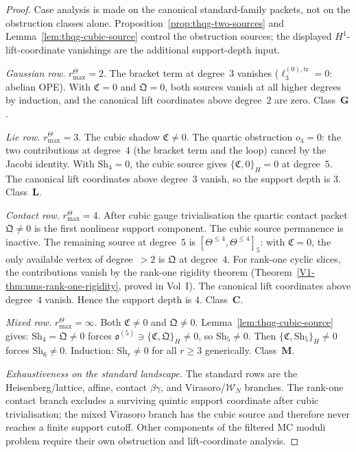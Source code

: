 \begin{proof}
Case analysis is made on the canonical standard-family packets,
not on the obstruction classes alone. Proposition~\ref{prop:thqg-two-sources}
and Lemma~\ref{lem:thqg-cubic-source} control the obstruction
sources; the displayed \(H^1\)-lift-coordinate vanishings are the
additional support-depth input.

\smallskip
\noindent\emph{Gaussian row.}
\(r^\Theta_{\max}=2\). The bracket term at degree~$3$ vanishes
($\ell_3^{(0),\mathrm{tr}} = 0$: abelian OPE).
With $\mathfrak{C} = 0$ and $\mathfrak{Q} = 0$, both
sources vanish at all higher degrees by induction, and the
canonical lift coordinates above degree~$2$ are zero.
Class~$\mathbf{G}$.

\smallskip
\noindent\emph{Lie row.}
\(r^\Theta_{\max}=3\). The cubic shadow \(\mathfrak{C}\neq0\).
The quartic obstruction $o_4 = 0$: the two contributions
at degree~$4$ (the bracket term and the loop) cancel by
the Jacobi identity. With $\mathrm{Sh}_4 = 0$, the cubic
source gives $\{\mathfrak{C}, 0\}_H = 0$ at degree~$5$.
The canonical lift coordinates above degree~$3$ vanish, so the
support depth is \(3\). Class~$\mathbf{L}$.

\smallskip
\noindent\emph{Contact row.}
\(r^\Theta_{\max}=4\). After cubic gauge trivialisation the
quartic contact packet \(\mathfrak{Q}\neq0\) is the first
nonlinear support component. The cubic source permanence is
inactive. The remaining source at degree~$5$ is
$[\Theta^{\leq 4}, \Theta^{\leq 4}]_5$: with
$\mathfrak{C} = 0$, the only available vertex of
degree~$> 2$ is $\mathfrak{Q}$ at degree~$4$. For
rank-one cyclic slices, the contributions vanish by the
rank-one rigidity theorem (Theorem~\ref{V1-thm:nms-rank-one-rigidity},
proved in Vol~I\@). The canonical lift coordinates above degree~$4$
vanish. Hence the support depth is \(4\).
Class~$\mathbf{C}$.

\smallskip
\noindent\emph{Mixed row.}
\(r^\Theta_{\max}=\infty\). Both $\mathfrak{C} \neq 0$ and
$\mathfrak{Q} \neq 0$.
Lemma~\ref{lem:thqg-cubic-source} gives:
$\mathrm{Sh}_4 = \mathfrak{Q} \neq 0$ forces
$\mathfrak{o}^{(5)} \ni \{\mathfrak{C}, \mathfrak{Q}\}_H
\neq 0$, so $\mathrm{Sh}_5 \neq 0$. Then
$\{\mathfrak{C}, \mathrm{Sh}_5\}_H \neq 0$ forces
$\mathrm{Sh}_6 \neq 0$. Induction: $\mathrm{Sh}_r \neq 0$
for all $r \geq 3$ generically. Class~$\mathbf{M}$.

\smallskip
\noindent\emph{Exhaustiveness on the standard landscape.}
The standard rows are the Heisenberg/lattice, affine, contact
\(\beta\gamma\), and Virasoro/\(\mathcal W_N\) branches. The
rank-one contact branch excludes a surviving quintic support
coordinate after cubic trivialisation; the mixed Virasoro branch
has the cubic source and therefore never reaches a finite support
cutoff. Other components of the filtered MC moduli problem require
their own obstruction and lift-coordinate analysis.
\end{proof}


